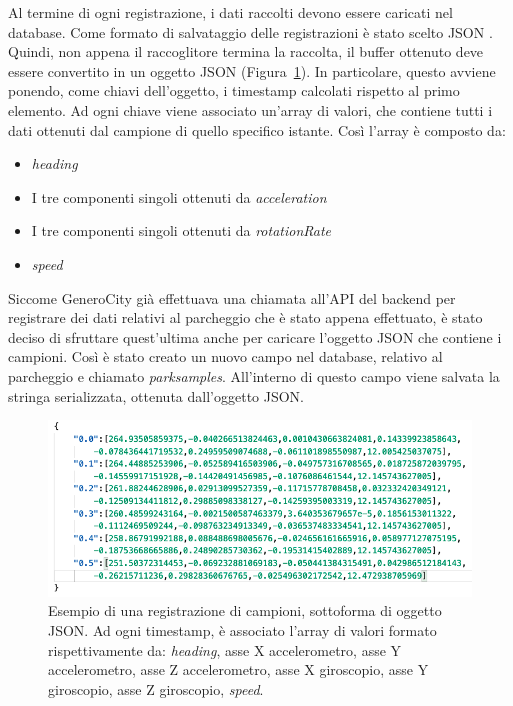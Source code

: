 Al termine di ogni registrazione, i dati raccolti devono essere caricati nel database.
Come formato di salvataggio delle registrazioni è stato scelto JSON 
\cite{javascript_object_notation} \cite{json_data_exchanging}. 
Quindi, non appena
il raccoglitore termina la raccolta, il buffer ottenuto deve essere convertito in un 
oggetto JSON (Figura~\ref{fig:esempio_campioni}). In particolare, questo avviene ponendo,
come chiavi dell'oggetto, i timestamp
calcolati rispetto al primo elemento. Ad ogni chiave viene associato un'array di valori, che
contiene tutti i dati ottenuti dal campione di quello specifico istante. Così l'array è
composto da:
\begin{itemize}
    \item \emph{heading}
    \item I tre componenti singoli ottenuti da \emph{acceleration}
    \item I tre componenti singoli ottenuti da \emph{rotationRate}
    \item \emph{speed}
\end{itemize}
Siccome GeneroCity già effettuava una chiamata all'API del backend per registrare dei dati
relativi al parcheggio che è stato appena effettuato, è stato deciso di sfruttare quest'ultima
anche per caricare l'oggetto JSON che contiene i campioni. Così è stato creato un nuovo campo
nel database, relativo al parcheggio e chiamato \emph{parksamples}. All'interno di questo campo
viene salvata la stringa serializzata, ottenuta dall'oggetto JSON.

\begin{figure}
    \centering
    \includegraphics[width=13cm]{images/esempio_campioni.png}
    \caption{Esempio di una registrazione di campioni, sottoforma di oggetto JSON. Ad ogni 
    timestamp, è associato l'array di valori formato rispettivamente da: \emph{heading}, asse X 
    accelerometro, asse Y accelerometro, asse Z accelerometro, asse X giroscopio, asse Y
    giroscopio, asse Z giroscopio, \emph{speed}.}
    \label{fig:esempio_campioni}
\end{figure}

